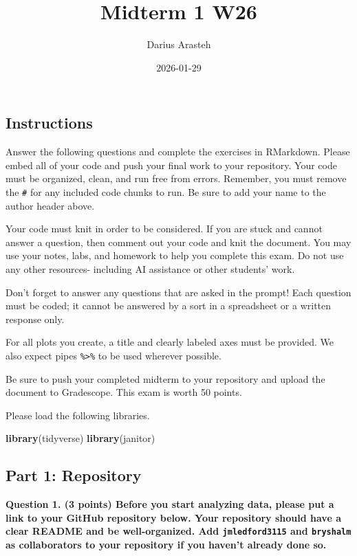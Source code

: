 \documentclass[
]{article}
\title{Midterm 1 W26}
\author{Darius Arasteh}
\date{2026-01-29}
\newenvironment{Shaded}{\begin{snugshade}}{\end{snugshade}}
\newcommand{\FunctionTok}[1]{\textcolor[rgb]{0.13,0.29,0.53}{\textbf{#1}}}
\newcommand{\NormalTok}[1]{#1}
\begin{document}
\maketitle

\subsection{Instructions}\label{instructions}

Answer the following questions and complete the exercises in RMarkdown.
Please embed all of your code and push your final work to your
repository. Your code must be organized, clean, and run free from
errors. Remember, you must remove the \texttt{\#} for any included code
chunks to run. Be sure to add your name to the author header above.

Your code must knit in order to be considered. If you are stuck and
cannot answer a question, then comment out your code and knit the
document. You may use your notes, labs, and homework to help you
complete this exam. Do not use any other resources- including AI
assistance or other students' work.

Don't forget to answer any questions that are asked in the prompt! Each
question must be coded; it cannot be answered by a sort in a spreadsheet
or a written response only.

For all plots you create, a title and clearly labeled axes must be
provided. We also expect pipes \texttt{\%\textgreater{}\%} to be used
wherever possible.

Be sure to push your completed midterm to your repository and upload the
document to Gradescope. This exam is worth 50 points.

Please load the following libraries.

\begin{Shaded}
\begin{Highlighting}[]
\FunctionTok{library}\NormalTok{(tidyverse)}
\FunctionTok{library}\NormalTok{(janitor)}
\end{Highlighting}
\end{Shaded}

\subsection{Part 1: Repository}\label{part-1-repository}

\textbf{Question 1. (3 points) Before you start analyzing data, please
put a link to your GitHub repository below. Your repository should have
a clear README and be well-organized. Add \texttt{jmledford3115} and
\texttt{bryshalm} as collaborators to your repository if you haven't
already done so.}
\end{document}
